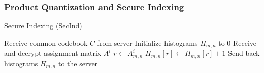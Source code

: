 \documentclass[11pt]{article}
\newcommand{\SecInd}{{\sc SecInd}\xspace}
\newcommand{\ashkan}[1]{{\color{blue}Ashkan: #1}}
\begin{document}
\subsubsection{Product Quantization and Secure Indexing}

\begin{algorithm}[t]
\caption{Secure Indexing (\SecInd)}
\label{alg:sec_indexing}
\begin{algorithmic}[1]


      
    \State Receive common codebook $C$ from server 
    \State Initialize histograms $H_{m,n}$ to $0$ 
    \State Receive and decrypt assignment matrix $A^i$ %
            \State $r \leftarrow A^i_{m, n}$ 
            \State $H_{m, n}[r] \leftarrow H_{m, n}[r] + 1$ 
        \EndFor
    \EndFor
    \State Send back histograms $H_{m, n}$ to the server
\EndProcedure
\end{algorithmic}
\end{algorithm}



\end{document}
